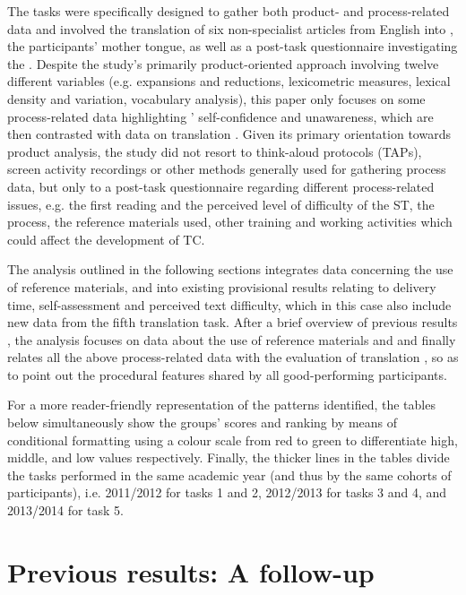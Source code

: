 \documentclass[output=paper]{LSP/langsci}
\begin{document}
\largerpage
The tasks were specifically designed to gather both product- and process-re\-lat\-ed data and involved the translation of six non-specialist articles from English into , the participants' mother tongue, as well as a post-task questionnaire investigating the . Despite the study's primarily product-oriented approach involving twelve different variables (e.g. expansions and reductions, lexicometric measures, lexical density and variation, vocabulary analysis), this paper only focuses on some process-related data highlighting ' self-confidence and unawareness, which are then contrasted with data on translation . Given its primary orientation towards product analysis, the study did not resort to think-aloud protocols (TAPs), screen activity recordings or other methods generally used for gathering process data, but only to a post-task questionnaire regarding different process-related issues, e.g. the first reading and the perceived level of difficulty of the ST, the  process, the reference materials used, other training and working activities which could affect the development of TC.

The analysis outlined in the following sections integrates data concerning the use of reference materials,  and  into existing provisional results relating to delivery time, self-assessment and perceived text difficulty, which in this case also include new data from the fifth translation task. After a brief overview of previous results \citep{Quinci2015a}, the analysis focuses on data about the use of reference materials and  and finally relates all the above process-related data with the evaluation of translation , so as to point out the procedural features shared by all good-performing participants.

For a more reader-friendly representation of the patterns identified, the tables below simultaneously show the groups' scores and ranking by means of conditional formatting using a colour scale from red to green to differentiate high, middle, and low values respectively. Finally, the thicker lines in the tables divide the tasks performed in the same academic year (and thus by the same cohorts of participants), i.e. 2011/2012 for tasks 1 and 2, 2012/2013 for tasks 3 and 4, and 2013/2014 for task 5.

\section{Previous results: A follow-up}
\end{document}
